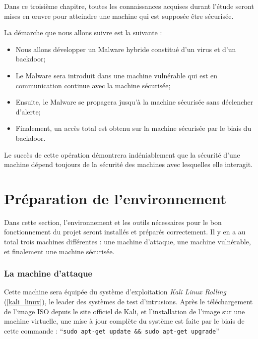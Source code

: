 
Dans ce troisième chapitre, toutes les connaissances acquises durant l'étude seront mises en œuvre pour atteindre
une machine qui est supposée être sécurisée. %

La démarche que nous allons suivre est la suivante : 
\begin{itemize}
    \item Nous allons développer un Malware hybride constitué d'un virus et d'un backdoor;
    \item Le Malware sera introduit dans une machine vulnérable qui est en communication continue
        avec la machine sécurisée;
    \item Ensuite, le Malware se propagera jusqu'à la machine sécurisée sans déclencher d'alerte;
    \item Finalement, un accès total est obtenu sur la machine sécurisée par le biais du backdoor.
\end{itemize}%

Le succès de cette opération démontrera indéniablement que la sécurité d'une machine dépend toujours
de la sécurité des machines avec lesquelles elle interagit.%

\newpage

\section{Préparation de l'environnement} \label{preparation_environnement}
Dans cette section, l'environnement et les outils nécessaires pour le bon fonctionnement du projet seront installés
et préparés correctement. Il y en a au total trois machines différentes : une machine d'attaque, une machine vulnérable,
et finalement une machine sécurisée. %

    \subsubsection{La machine d'attaque} 
    Cette machine sera équipée du système d'exploitation \emph{Kali Linux \cite{linux} Rolling} 
    (\autoref{kali_linux}), le 
    leader des systèmes de test d'intrusions. Après le téléchargement de l'image
    ISO depuis le site officiel de Kali, et l'installation de l'image sur
    une machine virtuelle, une mise à jour complète du système est faite par le biais de cette commande : 
    ``\texttt{sudo apt-get update \&\& sudo apt-get upgrade}''  %

